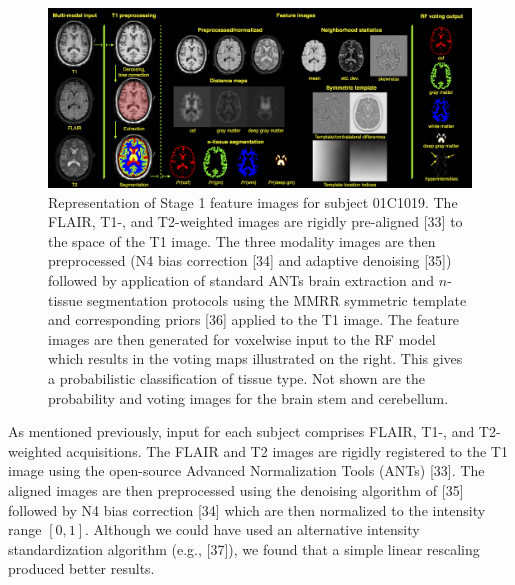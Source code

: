 \documentclass[11pt,]{article}
\begin{document}
\begin{figure}[htbp]
\centering
\includegraphics{Figures/featureImages.png}
\caption{Representation of Stage 1 feature images for subject 01C1019.
The FLAIR, T1-, and T2-weighted images are rigidly pre-aligned {[}33{]}
to the space of the T1 image. The three modality images are then
preprocessed (N4 bias correction {[}34{]} and adaptive denoising
{[}35{]}) followed by application of standard ANTs brain extraction and
\(n\)-tissue segmentation protocols using the MMRR symmetric template
and corresponding priors {[}36{]} applied to the T1 image. The feature
images are then generated for voxelwise input to the RF model which
results in the voting maps illustrated on the right. This gives a
probabilistic classification of tissue type. Not shown are the
probability and voting images for the brain stem and cerebellum.}
\end{figure}

As mentioned previously, input for each subject comprises FLAIR, T1-,
and T2-weighted acquisitions. The FLAIR and T2 images are rigidly
registered to the T1 image using the open-source Advanced Normalization
Tools (ANTs) {[}33{]}. The aligned images are then preprocessed using
the denoising algorithm of {[}35{]} followed by N4 bias correction
{[}34{]} which are then normalized to the intensity range \([0,1]\).
Although we could have used an alternative intensity standardization
algorithm (e.g., {[}37{]}), we found that a simple linear rescaling
produced better results.
\end{document}
